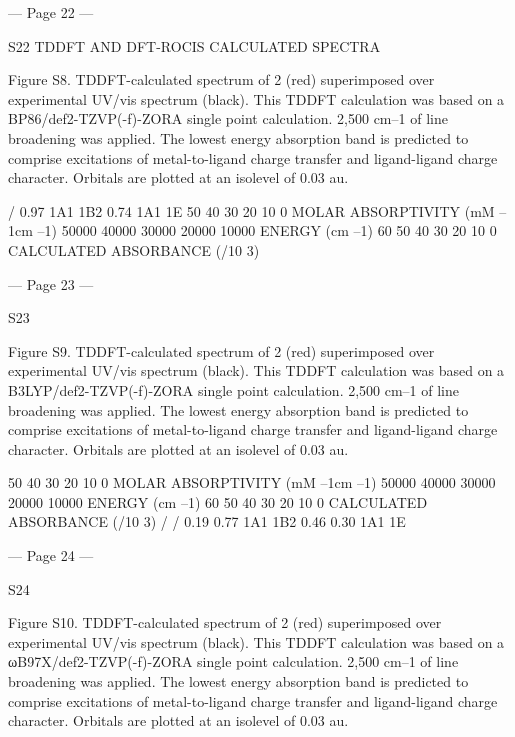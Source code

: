  
 
 
 
 
 
 
 
 
 
 
 
 
 
 
 
 
 
 
 


--- Page 22 ---
 
S22 
TDDFT AND DFT-ROCIS CALCULATED SPECTRA 
 
 
 
Figure S8. TDDFT-calculated spectrum of 2 (red) superimposed over experimental UV/vis 
spectrum (black). This TDDFT calculation was based on a BP86/def2-TZVP(-f)-ZORA single 
point calculation. 2,500 cm–1 of line broadening was applied. The lowest energy absorption band 
is predicted to comprise excitations of metal-to-ligand charge transfer and ligand-ligand charge 
character. Orbitals are plotted at an isolevel of 0.03 au. 
 
/ 
0.97 
1A1  
1B2  
0.74 
1A1  
1E  
50
40
30
20
10
0
MOLAR ABSORPTIVITY (mM
–1cm
–1)
50000
40000
30000
20000
10000
ENERGY (cm
–1)
60
50
40
30
20
10
0
CALCULATED ABSORBANCE (/10
3)


--- Page 23 ---
 
S23 
 
 
Figure S9. TDDFT-calculated spectrum of 2 (red) superimposed over experimental UV/vis 
spectrum (black). This TDDFT calculation was based on a B3LYP/def2-TZVP(-f)-ZORA single 
point calculation. 2,500 cm–1 of line broadening was applied. The lowest energy absorption band 
is predicted to comprise excitations of metal-to-ligand charge transfer and ligand-ligand charge 
character. Orbitals are plotted at an isolevel of 0.03 au. 
 
50
40
30
20
10
0
MOLAR ABSORPTIVITY (mM
–1cm
–1)
50000
40000
30000
20000
10000
ENERGY (cm
–1)
60
50
40
30
20
10
0
CALCULATED ABSORBANCE (/10
3)
/ 
/ 
0.19 
0.77 
1A1  
1B2  
0.46 
0.30 
1A1  
1E  


--- Page 24 ---
 
S24 
 
Figure S10. TDDFT-calculated spectrum of 2 (red) superimposed over experimental UV/vis 
spectrum (black). This TDDFT calculation was based on a ωB97X/def2-TZVP(-f)-ZORA single 
point calculation. 2,500 cm–1 of line broadening was applied. The lowest energy absorption band 
is predicted to comprise excitations of metal-to-ligand charge transfer and ligand-ligand charge 
character. Orbitals are plotted at an isolevel of 0.03 au. 
 
